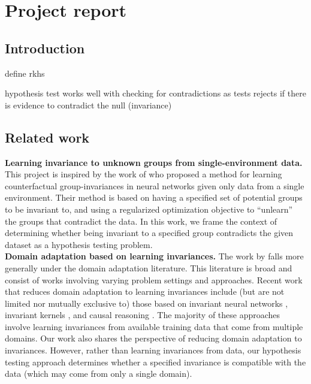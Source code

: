 

\section{Project report}

\subsection{Introduction}

\todo define rkhs

\todo
hypothesis test works well with checking for contradictions as tests rejects if there is evidence to contradict the null (invariance)

\subsection{Related work}

\textbf{Learning invariance to unknown groups from single-environment data.} This project is inspired by the work of \textcite{Mouli:2021} who proposed a method for learning counterfactual group-invariances in neural networks given only data from a single environment. Their method is based on having a specified set of potential groups to be invariant to, and using a regularized optimization objective to ``unlearn'' the groups that contradict the data. In this work, we frame the context of determining whether being invariant to a specified group contradicts the given dataset as a hypothesis testing problem.
\\

\textbf{Domain adaptation based on learning invariances.} The work by \textcite{Mouli:2021} falls more generally under the domain adaptation literature. This literature is broad and consist of works involving varying problem settings and approaches. Recent work that reduces domain adaptation to learning invariances include (but are not limited nor mutually exclusive to) those based on invariant neural networks \parencite{Li:2018,Zhao:2019,Schwobel:2021}, invariant kernels \parencite{Li:2018,Ma:2019,Elesedy:2021:equivariant,Elesedy:2021}, and causal reasoning \parencite{Magliacane:2017,Chen:2020:scm}. The majority of these approaches involve learning invariances from available training data that come from multiple domains. Our work also shares the perspective of reducing domain adaptation to invariances. However, rather than learning invariances from data, our hypothesis testing approach determines whether a specified invariance is compatible with the data (which may come from only a single domain).
\\

